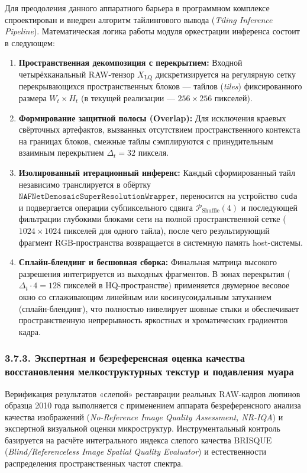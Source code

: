 \documentclass[12pt,a4paper]{article}
\begin{document}
Для преодоления данного аппаратного барьера в программном комплексе спроектирован и внедрен алгоритм тайлингового вывода (\textit{Tiling Inference Pipeline}). Математическая логика работы модуля оркестрации инференса состоит в следующем:
\begin{enumerate}
    \item \textbf{Пространственная декомпозиция с перекрытием:} Входной четырёхканальный RAW-тензор $X_{\text{LQ}}$ дискретизируется на регулярную сетку перекрывающихся пространственных блоков --- тайлов (\textit{tiles}) фиксированного размера $W_t \times H_t$ (в текущей реализации --- $256 \times 256$ пикселей).
    \item \textbf{Формирование защитной полосы (Overlap):} Для исключения краевых свёрточных артефактов, вызванных отсутствием пространственного контекста на границах блоков, смежные тайлы сэмплируются с принудительным взаимным перекрытием $\Delta_t = 32$ пикселя.
    \item \textbf{Изолированный итерационный инференс:} Каждый сформированный тайл независимо транслируется в обёртку $\texttt{NAFNetDemosaicSuperResolutionWrapper}$, переносится на устройство \texttt{cuda} и подвергается операции субпиксельного сдвига $\mathcal{P}_{\operatorname{Shuffle}}(4)$ и последующей фильтрации глубокими блоками сети на полной пространственной сетке ($1024 \times 1024$ пикселей для одного тайла), после чего результирующий фрагмент RGB-пространства возвращается в системную память host-системы.
    \item \textbf{Сплайн-блендинг и бесшовная сборка:} Финальная матрица высокого разрешения интегрируется из выходных фрагментов. В зонах перекрытия ($\Delta_t \cdot 4 = 128$ пикселей в HQ-пространстве) применяется двумерное весовое окно со сглаживающим линейным или косинусоидальным затуханием (сплайн-блендинг), что полностью нивелирует шовные стыки и обеспечивает пространственную непрерывность яркостных и хроматических градиентов кадра.
\end{enumerate}

\subsubsection{3.7.3. Экспертная и безреференсная оценка качества восстановления мелкоструктурных текстур и подавления муара}

Верификация результатов «слепой» реставрации реальных RAW-кадров люпинов образца 2010 года выполняется с применением аппарата безреференсного анализа качества изображений (\textit{No-Reference Image Quality Assessment, NR-IQA}) и экспертной визуальной оценки микроструктур. Инструментальный контроль базируется на расчёте интегрального индекса слепого качества $\text{BRISQUE}$ (\textit{Blind/Referenceless Image Spatial Quality Evaluator}) и естественности распределения пространственных частот спектра.
\end{document}

